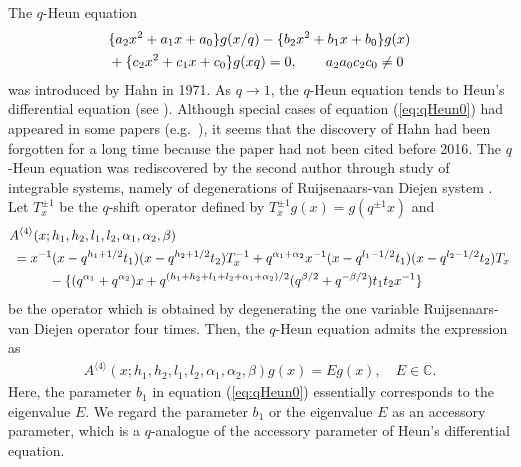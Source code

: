 \documentclass[12pt]{amsart}
\numberwithin{equation}{section}
\theoremstyle{definition}
\theoremstyle{remark}
\begin{document}
The $q$-Heun equation
\begin{align}
& \{a_{2}x^{2} + a_{1}x + a_{0}\}g(x/q) - \{b_{2}x^{2} + b_{1}x + b_{0} \}g(x) 
 \label{eq:qHeun0} \\
& + \{c_{2}x^{2} + c_{1}x + c_{0} \}g(xq) = 0, \qquad a_{2}a_{0}c_{2}c_{0} \neq 0 \notag
\end{align}
was introduced by Hahn \cite{Hahn} in 1971.
As $q \to 1$, the $q$-Heun equation tends to Heun's differential equation (see \cite{Hahn,TakR}).
Although special cases of equation (\ref{eq:qHeun0}) had appeared in some papers (e.g.~\cite{MP,WZ}), it seems that the discovery of Hahn had been forgotten for a long time because the paper \cite{Hahn} had not been cited before 2016. 
The $q$-Heun equation was rediscovered by the second author \cite{TakR} through study of integrable systems, namely of degenerations of Ruijsenaars-van Diejen system \cite{vD0,RuiN}.
Let $T_{x}^{\pm 1}$ be the $q$-shift operator defined by $T_{x}^{\pm 1} g(x) = g(q^{\pm 1}x)$ and 
\begin{align}
  &A^{\langle 4 \rangle} (x; h_{1}, h_{2}, l_{1}, l_{2}, \alpha_{1}, \alpha_{2}, \beta) \label{eq:A4} \\
  &\; = x^{-1} (x-q^{h_{1} + 1/2} t_{1}) (x-q^{h_{2} +1/2} t_{2}) T_{x}^{-1}  + q^{\alpha_{1} + \alpha_{2}} x^{-1} (x - q^{l_{1} -1/2} t_{1})(x - q^{l_{2} - 1/2} t_{2}) T_{x} \notag \\
  &\qquad \quad - \{(q^{\alpha_{1}} + q^{\alpha_{2}})x + q^{(h_{1} + h_{2} + l_{1} + l_{2} + \alpha_{1} + \alpha_{2})/2}(q^{\beta/2} + q^{-\beta/2}) t_{1} t_{2} x^{-1}\} \notag
\end{align}
be the operator which is obtained by degenerating the one variable Ruijsenaars-van Diejen operator four times.
Then, the $q$-Heun equation admits the expression as
  \begin{align}
    A^{\langle 4 \rangle} (x; h_{1}, h_{2}, l_{1}, l_{2}, \alpha_{1}, \alpha_{2}, \beta) g(x) = E g(x), \quad \text{$E \in \mathbb{C}$}. \label{eq:q-Heun}
  \end{align}
Here, the parameter $b_{1}$ in equation (\ref{eq:qHeun0}) essentially corresponds to the eigenvalue $E$.
We regard the parameter $b_{1}$ or the eigenvalue $E$ as an accessory parameter, which is a $q$-analogue of the accessory parameter of Heun's differential equation.
\end{document}
